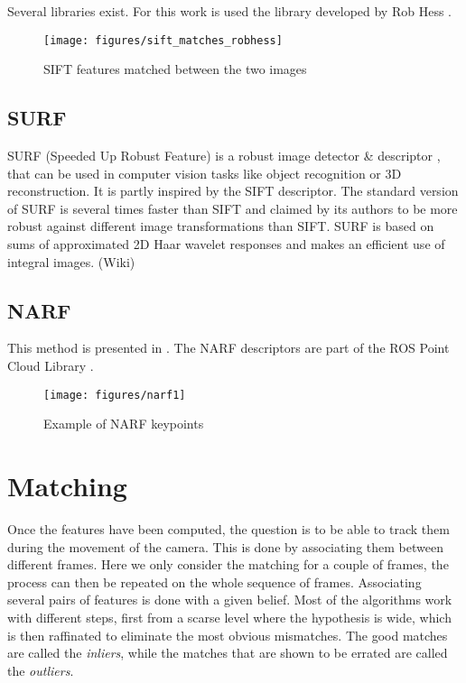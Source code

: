 Several libraries exist. For this work is used the library developed by Rob Hess \cite{hess_sift}.

\begin{figure}[h]
\centering
\texttt{[image: figures/sift\_matches\_robhess]}
\caption{SIFT features matched between the two images}
\end{figure}

\subsection{SURF}
SURF (Speeded Up Robust Feature) is a robust image detector \& descriptor \cite{surf}, that can be used in computer vision tasks like object recognition or 3D reconstruction. It is partly inspired by the SIFT descriptor. The standard version of SURF is several times faster than SIFT and claimed by its authors to be more robust against different image transformations than SIFT. SURF is based on sums of approximated 2D Haar wavelet responses and makes an efficient use of integral images. (Wiki)

\subsection{NARF}
This method is presented in \cite{steder10irosws}. The NARF descriptors are part of the ROS Point Cloud Library \cite{Rusu_ICRA2011_PCL}.

\begin{figure}[h]
\centering
\texttt{[image: figures/narf1]}
\caption{Example of NARF keypoints}
\end{figure}

\section{Matching}

Once the features have been computed, the question is to be able to track them during the movement of the camera. This is done by associating them between different frames. Here we only consider the matching for a couple of frames, the process can then be repeated on the whole sequence of frames. Associating several pairs of features is done with a given belief. Most of the algorithms work with different steps, first from a scarse level where the hypothesis is wide, which is then raffinated to eliminate the most obvious mismatches. The good matches are called the \emph{inliers}, while the matches that are shown to be errated are called the \emph{outliers}.


